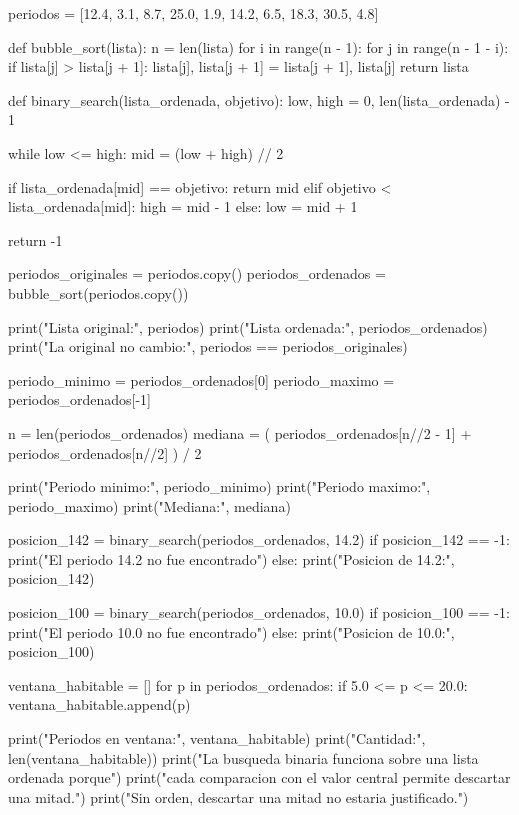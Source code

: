 \begin{solution}
\begin{pythonjupyter}
periodos = [12.4, 3.1, 8.7, 25.0, 1.9,
            14.2, 6.5, 18.3, 30.5, 4.8]

def bubble_sort(lista):
    n = len(lista)
    for i in range(n - 1):
        for j in range(n - 1 - i):
            if lista[j] > lista[j + 1]:
                lista[j], lista[j + 1] = lista[j + 1], lista[j]
    return lista

def binary_search(lista_ordenada, objetivo):
    low, high = 0, len(lista_ordenada) - 1

    while low <= high:
        mid = (low + high) // 2

        if lista_ordenada[mid] == objetivo:
            return mid
        elif objetivo < lista_ordenada[mid]:
            high = mid - 1
        else:
            low = mid + 1

    return -1

periodos_originales = periodos.copy()
periodos_ordenados = bubble_sort(periodos.copy())

print("Lista original:", periodos)
print("Lista ordenada:", periodos_ordenados)
print("La original no cambio:", periodos == periodos_originales)

periodo_minimo = periodos_ordenados[0]
periodo_maximo = periodos_ordenados[-1]

n = len(periodos_ordenados)
mediana = (
    periodos_ordenados[n//2 - 1] +
    periodos_ordenados[n//2]
) / 2

print("Periodo minimo:", periodo_minimo)
print("Periodo maximo:", periodo_maximo)
print("Mediana:", mediana)

posicion_142 = binary_search(periodos_ordenados, 14.2)
if posicion_142 == -1:
    print("El periodo 14.2 no fue encontrado")
else:
    print("Posicion de 14.2:", posicion_142)

posicion_100 = binary_search(periodos_ordenados, 10.0)
if posicion_100 == -1:
    print("El periodo 10.0 no fue encontrado")
else:
    print("Posicion de 10.0:", posicion_100)

ventana_habitable = []
for p in periodos_ordenados:
    if 5.0 <= p <= 20.0:
        ventana_habitable.append(p)

print("Periodos en ventana:", ventana_habitable)
print("Cantidad:", len(ventana_habitable))
print("La busqueda binaria funciona sobre una lista ordenada porque")
print("cada comparacion con el valor central permite descartar una mitad.")
print("Sin orden, descartar una mitad no estaria justificado.")
\end{pythonjupyter}
\end{solution}
